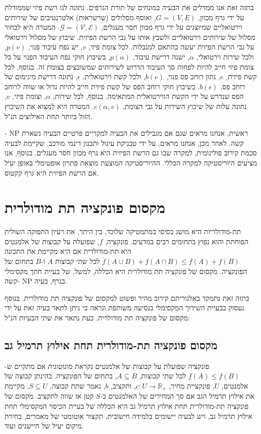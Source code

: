 \begin{hebrew}
בתזה זאת אנו ממדלים את הבעיה במונחים של תורת הגרפים.
נתונה לנו רשת פיזי שממודלת על ידי גרף מכוון,
$G=(V,E)$,
ואוסף מסלולים (שרשראות) אלטרנטיבים של שירותים וירטואליים שמיוצגים על ידי גרף מכוון חסר מעגלים,
$\mathcal{G} = (\mathcal{V}, \mathcal{E})$.
המטרה היא לבחור מסלול של שירותים וירטואליים ולשבץ אותו על גבי הרשת הפיזית.
שיבוץ של מסלול וירטואלי על גבי הרשת הפיזית יעשה בהתאם למגבלות.
לכל צומת פיזי,
$v$,
 יש נפח עיבוד פנוי,
$p(v)$,
ולכל שירות וירטואלי,
$\alpha$,
ישנה דרישת עיבוד,
$p(\alpha)$,
בשיבוץ חוקי נפח העיבוד הפנוי על כל צומת פיזי חייב להיות לפחות סך העיבוד הדרוש לשירותים שמשובצים בצומת זה.
בנוסף, לכל קשת פיזית,
$e$,
נתון רוחב פס פנוי,
$b(e)$,
ולכל קשת וירטואלית,
$\epsilon$,
נתונה דרישת מינימום של רוחב פס,
$b(\epsilon)$.
בשיבוץ חוקי רוחב הפס של קשת פיזית חייב להיות גדול או שווה לרוחב הפס שנדרש על ידי הקשת הווירטואלית  המתאימה.
בנוסף, לכל שירות,
$\alpha$,
וצומת פיזי,
$v$,
נתונה עלות של שיבוץ השירות על גבי הצומת,
$c(\alpha, v)$.
המטרה היא למצוא את השיבוץ הזול ביותר תחת האילוצים הנ"ל.

ראשית, אנחנו מראים שגם אם מגבילים את הבעיה למקריים פרטיים הבעיה נשארת
$\text{NP}$%
-קשה.
לאחר מכן, אנחנו מראים, על ידי טכניקת עיגול ותכנון דינמי מורכב, שקיימת לבעיה סכמת קירוב פולינומית, למקרה שבו גם הרשת הפיזית היא גרף מכוון חסר מעגלים.
בנוסף, אנו מציעים היוריסטיקה למקרה הכללי.
ההיוריסטיקה המוצעת  מוצאת פתרון אופטימלי באופן יעיל אם הרשת הפיזית היא גרף קקטוס.


\section*{\texthebrew{מקסום פונקציה תת מודולרית}}
תת-מודולריות היא מושג בסיסי במתמטיקה שלוכד, בין היתר, את רעיון התפוקה השולית הפוחתת והוא נפוץ בתחומים רבים במדעים.
פונקציה,
$f$,
שפועלת על קבוצות של אלמנטים היא תת-מודולרית אם היא מקיימת את התכונה
$f(A \cup B) + f(A \cap B) \leq f(A) + f(B)$
לכל שתי קבוצות $A$ ו-$B$ בתחום של הפונקציה.
מקסום של פונקציה תת מודולרית היא הכללה, למשל, של בעיית חתך מקסימלי בגרף, בעיה
$\text{NP}$
-קשה.

בתזה זאת נתמקד באלגוריתם קירוב מהיר ופשוט למקסום של פונקציה תת מודולרית.
בנוסף נעסוק בבעיית השידוך המקסימלי בנסיעה משותפת ונראה כי ניתן לתאר בעיה זאת על ידי מקסום של פונקציה תת מודולרית.
כעת נתאר את שתי הבעיות הנ"ל:

\subsection*{\texthebrew{מקסום פונקציה תת-מודולרית תחת אילוץ תרמיל גב}}
פונקציה שפועלת על קבוצות  של אלמנטים נקראת
\emph{מונוטונית}
אם מתקיים ש-%
$f(A) \leq f(B)$
לכל שתי קבוצות,
$A \subseteq B$,
בתחום של הפונקציה.
בהינתן קבוצה של אלמנטים, $U$, פונקציית מחיר,
$c:U \to \mathbb{R_+}$,
ותקציב, $b$, נאמר שתת קבוצה,
$S \subseteq U$,
מקיימת את אילוץ תרמיל הגב אם סך המחירים של האלמנטים ב-$S$ קטן או שווה לתקציב.
מקסום של פונקציה תת-מודולרית תחת אילוץ תרמיל גב היא הכללה של בעיית הכיסוי המקסימלי תחת אילוץ תרמיל גב,
ויש לבעיה יישומים בלמידה חישובית, תקצור אוטומטי של מאמרים, בחירת מיקום יעיל של חיישנים ועוד.



\end{hebrew}
